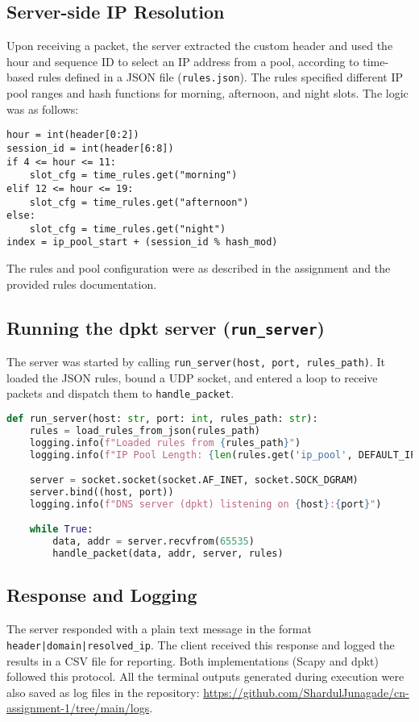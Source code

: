 \documentclass[10pt,a4paper]{report}
\begin{document}

\subsection{Server-side IP Resolution}
Upon receiving a packet, the server extracted the custom header and used the hour and sequence ID to select an IP address from a pool, according to time-based rules defined in a JSON file (\texttt{rules.json}). The rules specified different IP pool ranges and hash functions for morning, afternoon, and night slots. The logic was as follows:
\begin{lstlisting}
hour = int(header[0:2])
session_id = int(header[6:8])
if 4 <= hour <= 11:
    slot_cfg = time_rules.get("morning")
elif 12 <= hour <= 19:
    slot_cfg = time_rules.get("afternoon")
else:
    slot_cfg = time_rules.get("night")
index = ip_pool_start + (session_id % hash_mod)
\end{lstlisting}
The rules and pool configuration were as described in the assignment and the provided rules documentation.

\subsection{Running the dpkt server (\texttt{run\_server})}
The server was started by calling \texttt{run\_server(host, port, rules\_path)}. It loaded the JSON rules, bound a UDP socket, and entered a loop to receive packets and dispatch them to \texttt{handle\_packet}.

\begin{lstlisting}[language=Python, caption={Server startup: run_server()}, label={lst:run-server}]
def run_server(host: str, port: int, rules_path: str):
    rules = load_rules_from_json(rules_path)
    logging.info(f"Loaded rules from {rules_path}")
    logging.info(f"IP Pool Length: {len(rules.get('ip_pool', DEFAULT_IP_POOL))}")

    server = socket.socket(socket.AF_INET, socket.SOCK_DGRAM)
    server.bind((host, port))
    logging.info(f"DNS server (dpkt) listening on {host}:{port}")

    while True:
        data, addr = server.recvfrom(65535)
        handle_packet(data, addr, server, rules)
\end{lstlisting}


\subsection{Response and Logging}
The server responded with a plain text message in the format \texttt{header|domain|resolved\_ip}. The client received this response and logged the results in a CSV file for reporting. Both implementations (Scapy and dpkt) followed this protocol. All the terminal outputs generated during execution were also saved as log files in the repository: \url{https://github.com/ShardulJunagade/cn-assignment-1/tree/main/logs}.
\end{document}
